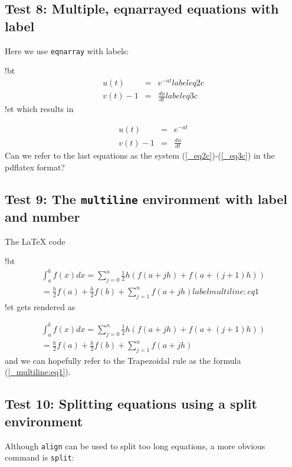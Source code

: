 \documentclass[%
oneside,                 %
final,                   %
10pt]{article}
\begin{document}
\subsection{Test 8: Multiple, eqnarrayed equations with label}

Here we use \texttt{eqnarray} with labels:

\blatexcod
!bt
\begin{eqnarray}
u(t)&=& e^{-at}
label{eq2c}\\ 
v(t) - 1 &=& \frac{du}{dt}
label{eq3c}
\end{eqnarray}
!et
\elatexcod
which results in

\begin{eqnarray}
u(t)&=& e^{-at} \label{_eq2c}\\ 
v(t) - 1 &=& \frac{du}{dt} \label{_eq3c}
\end{eqnarray}
Can we refer to the last equations as the system (\ref{_eq2c})-(\ref{_eq3c})
in the pdflatex format?

\subsection{Test 9: The \texttt{multiline} environment with label and number}

The {\LaTeX} code

\blatexcod
!bt
\begin{multline}
\int_a^b f(x)dx = \sum_{j=0}^{n} \frac{1}{2} h(f(a+jh) +
f(a+(j+1)h)) \\ 
=\frac{h}{2}f(a) + \frac{h}{2}f(b) + \sum_{j=1}^n f(a+jh)
label{multiline:eq1}
\end{multline}
!et
\elatexcod
gets rendered as

\begin{multline}
\int_a^b f(x)dx = \sum_{j=0}^{n} \frac{1}{2} h(f(a+jh) +
f(a+(j+1)h)) \\ 
=\frac{h}{2}f(a) + \frac{h}{2}f(b) + \sum_{j=1}^n f(a+jh)
\label{_multiline:eq1}
\end{multline}
and we can hopefully refer to the Trapezoidal rule
as the formula (\ref{_multiline:eq1}).

\subsection{Test 10: Splitting equations using a split environment}

Although \texttt{align} can be used to split too long equations, a more obvious
command is \texttt{split}:
\end{document}
